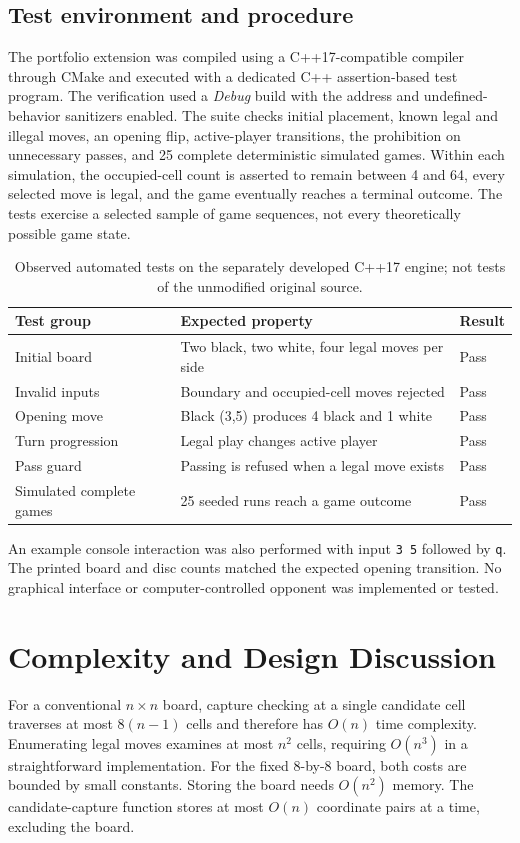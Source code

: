 \documentclass[11pt,a4paper]{article}
\newcommand{\code}[1]{\texttt{#1}}
\begin{document}
\subsection{Test environment and procedure}
The portfolio extension was compiled using a C++17-compatible compiler through CMake and executed with a dedicated C++ assertion-based test program. The verification used a \emph{Debug} build with the address and undefined-behavior sanitizers enabled. The suite checks initial placement, known legal and illegal moves, an opening flip, active-player transitions, the prohibition on unnecessary passes, and 25 complete deterministic simulated games. Within each simulation, the occupied-cell count is asserted to remain between 4 and 64, every selected move is legal, and the game eventually reaches a terminal outcome. The tests exercise a selected sample of game sequences, not every theoretically possible game state.

\begin{table}[htbp]\centering\small
\begin{tabular}{@{}p{65mm}p{65mm}p{20mm}@{}}\toprule
Test group & Expected property & Result\\\midrule
Initial board & Two black, two white, four legal moves per side & Pass\\
Invalid inputs & Boundary and occupied-cell moves rejected & Pass\\
Opening move & Black (3,5) produces 4 black and 1 white & Pass\\
Turn progression & Legal play changes active player & Pass\\
Pass guard & Passing is refused when a legal move exists & Pass\\
Simulated complete games & 25 seeded runs reach a game outcome & Pass\\\bottomrule
\end{tabular}\caption{Observed automated tests on the separately developed C++17 engine; not tests of the unmodified original source.}\end{table}

An example console interaction was also performed with input \code{3 5} followed by \code{q}. The printed board and disc counts matched the expected opening transition. No graphical interface or computer-controlled opponent was implemented or tested.

\section{Complexity and Design Discussion}
For a conventional $n\times n$ board, capture checking at a single candidate cell traverses at most $8(n-1)$ cells and therefore has $O(n)$ time complexity. Enumerating legal moves examines at most $n^2$ cells, requiring $O(n^3)$ in a straightforward implementation. For the fixed 8-by-8 board, both costs are bounded by small constants. Storing the board needs $O(n^2)$ memory. The candidate-capture function stores at most $O(n)$ coordinate pairs at a time, excluding the board.
\end{document}
